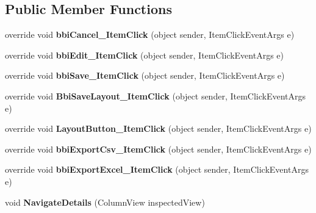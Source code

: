 \subsection*{Public Member Functions}
\begin{DoxyCompactItemize}
\item 
\mbox{\label{class_h_k_supply_1_1_forms_1_1_master_1_1_bom_management_a83d6aecc7ddd4f198b53998ed75da16c}} 
override void {\bfseries bbi\+Cancel\+\_\+\+Item\+Click} (object sender, Item\+Click\+Event\+Args e)
\item 
\mbox{\label{class_h_k_supply_1_1_forms_1_1_master_1_1_bom_management_a968d0043e7f099cacec265b58d29aa4a}} 
override void {\bfseries bbi\+Edit\+\_\+\+Item\+Click} (object sender, Item\+Click\+Event\+Args e)
\item 
\mbox{\label{class_h_k_supply_1_1_forms_1_1_master_1_1_bom_management_a5be15ec8e02d12d776fff1eee75708c9}} 
override void {\bfseries bbi\+Save\+\_\+\+Item\+Click} (object sender, Item\+Click\+Event\+Args e)
\item 
\mbox{\label{class_h_k_supply_1_1_forms_1_1_master_1_1_bom_management_a0081b5bd9372bf7d3048f408f1670376}} 
override void {\bfseries Bbi\+Save\+Layout\+\_\+\+Item\+Click} (object sender, Item\+Click\+Event\+Args e)
\item 
\mbox{\label{class_h_k_supply_1_1_forms_1_1_master_1_1_bom_management_a3e33bc3261e99113b5afaf9115120627}} 
override void {\bfseries Layout\+Button\+\_\+\+Item\+Click} (object sender, Item\+Click\+Event\+Args e)
\item 
\mbox{\label{class_h_k_supply_1_1_forms_1_1_master_1_1_bom_management_a2394e9e649ae35cc0c387860f8c5e379}} 
override void {\bfseries bbi\+Export\+Csv\+\_\+\+Item\+Click} (object sender, Item\+Click\+Event\+Args e)
\item 
\mbox{\label{class_h_k_supply_1_1_forms_1_1_master_1_1_bom_management_a881d07707b884fc97bff4d886c2e43ba}} 
override void {\bfseries bbi\+Export\+Excel\+\_\+\+Item\+Click} (object sender, Item\+Click\+Event\+Args e)
\item 
\mbox{\label{class_h_k_supply_1_1_forms_1_1_master_1_1_bom_management_acef30e27dc811984ec2d2c539f5b0bea}} 
void {\bfseries Navigate\+Details} (Column\+View inspected\+View)
\end{DoxyCompactItemize}

